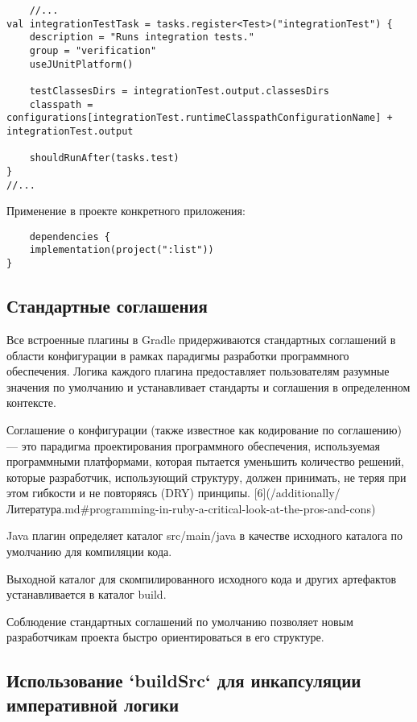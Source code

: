 \begin{lstlisting}
    //...
val integrationTestTask = tasks.register<Test>("integrationTest") {
    description = "Runs integration tests."
    group = "verification"
    useJUnitPlatform()

    testClassesDirs = integrationTest.output.classesDirs
    classpath = configurations[integrationTest.runtimeClasspathConfigurationName] + integrationTest.output

    shouldRunAfter(tasks.test)
}
//...
\end{lstlisting}

Применение в проекте конкретного приложения:

\begin{lstlisting}
    dependencies {
    implementation(project(":list"))
}
\end{lstlisting}

\subsection{Стандартные соглашения}\label{subsec:-}

Все встроенные плагины в Gradle придерживаются стандартных соглашений в области конфигурации в
рамках парадигмы разработки программного обеспечения.
Логика каждого плагина предоставляет
пользователям разумные значения по умолчанию и устанавливает стандарты и соглашения в определенном
контексте.

Соглашение о конфигурации (также известное как кодирование по соглашению) — это парадигма
проектирования программного обеспечения, используемая программными платформами, которая пытается
уменьшить количество решений, которые разработчик, использующий структуру, должен принимать, не
теряя при этом гибкости и не повторяясь (DRY)
принципы.
[6](/additionally/Литература.md\#programming-in-ruby-a-critical-look-at-the-pros-and-cons)

Java плагин определяет каталог src/main/java в качестве исходного каталога по умолчанию для
компиляции кода.

Выходной каталог для скомпилированного исходного кода и других артефактов
устанавливается в каталог build.

Соблюдение стандартных соглашений по умолчанию позволяет новым разработчикам проекта быстро
ориентироваться в его структуре.

\subsection{Использование `buildSrc` для инкапсуляции императивной логики}\label{subsec:-`buildsrc`----}


